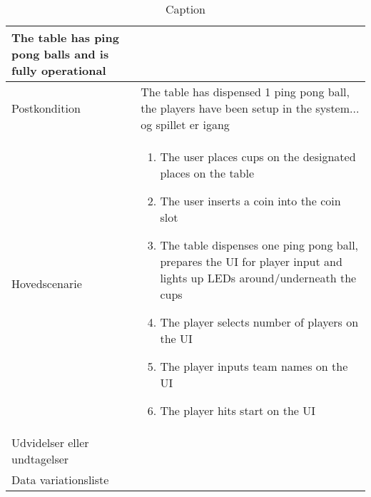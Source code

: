 \begin{table}[]
\begin{tabular}[]{@{}ll@{}}
\begin{minipage}[t]{0.47\columnwidth}
{The table has ping pong balls and is fully operational}\strut
\end{minipage}\tabularnewline
\hline
\begin{minipage}[t]{0.47\columnwidth}\raggedright
{Postkondition}\strut
\end{minipage} & \begin{minipage}[t]{0.47\columnwidth}\raggedright
{The table has dispensed 1 ping pong ball, the players have been setup in the system... og spillet er igang}\strut
\end{minipage}\tabularnewline
\hline
\begin{minipage}[t]{0.47\columnwidth}\raggedright
{Hovedscenarie}\strut
\end{minipage} & \begin{minipage}[t]{0.47\columnwidth}\raggedright
\begin{enumerate}
\tightlist
\item
  {The user places cups on the designated places on the table}
\item
  {The user inserts a coin into the coin slot}
\item
  {The table dispenses one ping pong ball, prepares the UI for
  player input and lights up LEDs around/underneath the cups}
\item
  {The player selects number of players on the UI}
\item
  {The player inputs team names on the UI}
\item
  {The player hits start on the UI}
\end{enumerate}\strut
\end{minipage}\tabularnewline
\hline
\begin{minipage}[t]{0.47\columnwidth}\raggedright
{Udvidelser eller undtagelser}\strut
\end{minipage} & \begin{minipage}[t]{0.47\columnwidth}\raggedright
{}\strut
\end{minipage}\tabularnewline
\hline
\begin{minipage}[t]{0.47\columnwidth}\raggedright
{Data variationsliste}\strut
\end{minipage} & \begin{minipage}[t]{0.47\columnwidth}\raggedright
{}\strut
\end{minipage}\tabularnewline
\hline
\hline
\end{tabular}
    \caption{Caption}
    \label{tab:UC1}
\end{table}

